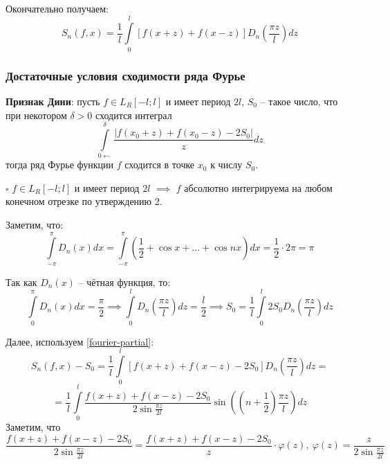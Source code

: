 \documentclass[12pt, a4paper, reqno]{article}
\begin{document}
    Окончательно получаем:
    \begin{equation}\label{fourier-partial}
        \boxed{S_n(f, x) = \frac{1}{l}
               \int\limits_{0}^{l}[f(x + z) + f(x - z)] D_n\left(\frac{\pi z}{l}\right)dz}
    \end{equation}

    \subsubsection{Достаточные условия сходимости ряда Фурье}

    \textbf{Признак Дини}: пусть $f \in L_R[-l; l]$ и имеет период $2l$, $S_0$ -- такое число, что
    при некотором $\delta > 0$ сходится интеграл
    \begin{equation*}
        \int\limits_{0 \leftarrow}^{\delta} \frac{|f(x_0 + z) + f(x_0 - z) - 2S_0|}{z}dz
    \end{equation*}
    тогда ряд Фурье функции $f$ сходится в точке $x_0$ к числу $S_0$.

    $\square$ $f \in L_R[-l; l]$ и имеет период $2l$ $\implies$ $f$ абсолютно интегрируема на
    любом конечном отрезке по утверждению 2.

    Заметим, что:
    \begin{equation*}
        \int\limits_{-\pi}^{\pi} D_n(x)dx =
        \int\limits_{-\pi}^{\pi}\left(\frac{1}{2} + \cos{x} + \ldots + \cos{nx}\right)dx =
        \frac{1}{2} \cdot 2\pi = \pi
    \end{equation*}

    Так как $D_n(x)$ -- чётная функция, то:
    \begin{equation*}
        \int\limits_{0}^{\pi} D_n(x)dx = \frac{\pi}{2} \implies
        \int\limits_{0}^{l} D_n\left(\frac{\pi z}{l}\right)dz = \frac{l}{2} \implies
        S_0 = \frac{1}{l}\int\limits_{0}^{l} 2S_0 D_n\left(\frac{\pi z}{l}\right)dz
    \end{equation*}

    Далее, используем \eqref{fourier-partial}:
    \begin{equation*}
        S_n(f, x) - S_0 = \frac{1}{l}\int\limits_{0}^{l} \left[f(x + z) + f(x - z) - 2S_0\right]
        D_n\left(\frac{\pi z}{l}\right)dz =
    \end{equation*}
    \begin{equation}\label{fourier-partial-sum-minus-value}
        = \frac{1}{l}\int\limits_{0}^{l} \frac{f(x + z) + f(x - z) - 2S_0}{2\sin{\frac{\pi z}{2l}}}
        \sin{\left(\left(n + \frac{1}{2}\right)\frac{\pi z}{l}\right)}dz
    \end{equation}
    Заметим, что
    \begin{equation*}
        \frac{f(x + z) + f(x - z) - 2S_0}{2\sin{\frac{\pi z}{2l}}} =
        \frac{f(x + z) + f(x - z) - 2S_0}{z} \cdot \varphi(z),\
        \varphi(z) = \frac{z}{2\sin{\frac{\pi z}{2l}}}
    \end{equation*}
\end{document}
